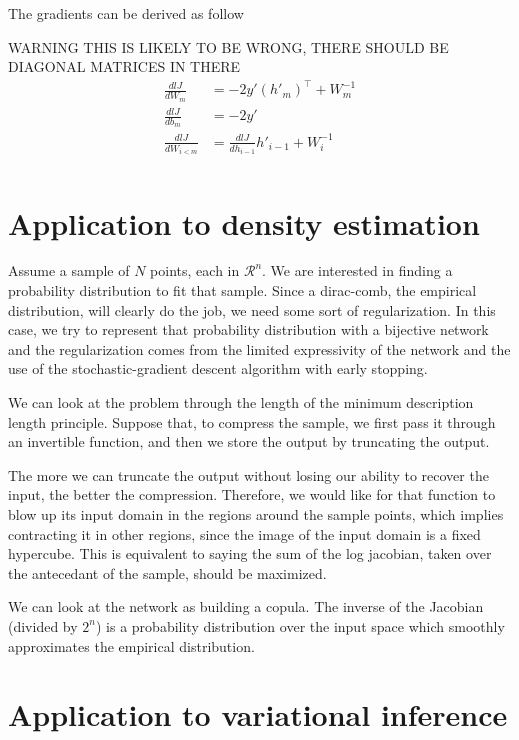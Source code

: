 \documentclass{article}
\begin{document}
The gradients can be derived as follow

WARNING THIS IS LIKELY TO BE WRONG, THERE SHOULD BE DIAGONAL MATRICES
IN THERE
\[
  \begin{aligned}
  \frac{d lJ}{d W_m} &= - 2 y' (h'_m)^{\top} + W_m^{-1}\\
  \frac{d lJ}{d b_m} &= - 2 y'\\
  \frac{d lJ}{d W_{i < m}} &= \frac{d lJ}{d h_{i-1}} h'_{i-1} + W_{i}^{-1}\\
\end{aligned}
\]

\section{Application to density estimation}

Assume a sample of \(N\) points, each in \(\mathcal{R}^n\). We are interested in
finding a probability distribution to fit that sample. Since a dirac-comb,
the empirical distribution, will clearly do the job, we need some sort of
regularization. In this case, we try to represent that probability distribution
with a bijective network and the regularization comes from the limited
expressivity of the network and the use of the stochastic-gradient descent
algorithm with early stopping.

We can look at the problem through the length of the minimum description length
principle. Suppose that, to compress the sample, we first pass it through an
invertible function, and then we store the output by truncating the output.

The more we can truncate the output without losing our ability to recover the
input, the better the compression. Therefore, we would like for that function
to blow up its input domain in the regions around the sample points, which
implies contracting it in other regions, since the image of the input domain
is a fixed hypercube. This is equivalent to saying the sum of the log jacobian,
taken over the antecedant of the sample, should be maximized.

We can look at the network as building a copula. The inverse of the Jacobian
(divided by \(2^n\)) is a probability distribution over the input space which
smoothly approximates the empirical distribution.

\section{Application to variational inference}
\end{document}
